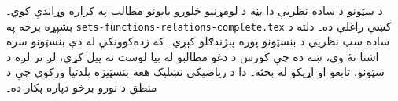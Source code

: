 \documentclass[../../include/open-logic-part]{subfiles}
\begin{document}

\begin{editorial}
  د سټونو د ساده نظريې دا بڼه د لومړنيو څلورو بابونو مطالب په کراره وړاندې کوي۔ بشپړه برخه په \verb|sets-functions-relations-complete.tex| کښې راغلې ده۔ دلته د ساده سټ نظريې د بنسټونو پوره پېژندګلو کېږي۔ که زده‌کوونکي له دې بنسټونو سره اشنا نۀ وي، ښه ده چې کورس د دغو مطالبو له بيا لوست نه پيل کړي، لږ تر لږه د سټونو، تابعو او اړيکو له بحثه۔ دا د رياضيکي نښليک هغه بنسټيزه بلدتيا ورکوي چې د منطق د نورو برخو دپاره پکار ده۔
\end{editorial}





\OLEndPartHook
\end{document}
